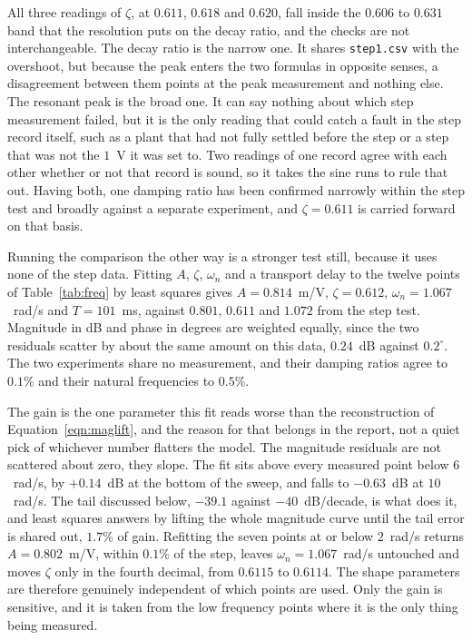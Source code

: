 All three readings of $\zeta$, at $0.611$, $0.618$ and $0.620$, fall inside the $0.606$ to
$0.631$ band that the resolution puts on the decay ratio, and the checks are not
interchangeable. The decay ratio is the narrow one. It shares \texttt{step1.csv} with the
overshoot, but because the peak enters the two formulas in opposite senses, a disagreement
between them points at the peak measurement and nothing else. The resonant peak is the broad
one. It can say nothing about which step measurement failed, but it is the only reading that
could catch a fault in the step record itself, such as a plant that had not fully settled
before the step or a step that was not the $1$~V it was set to. Two readings of one record
agree with each other whether or not that record is sound, so it takes the sine runs to rule
that out. Having both, one damping ratio has been confirmed narrowly within the step test
and broadly against a separate experiment, and $\zeta = 0.611$ is carried forward on that
basis.

Running the comparison the other way is a stronger test still, because it uses none of the
step data. Fitting $A$, $\zeta$, $\omega_n$ and a transport delay to the twelve points of
Table~\ref{tab:freq} by least squares gives $A = 0.814$~m/V, $\zeta = 0.612$,
$\omega_n = 1.067$~rad/s and $T = 101$~ms, against $0.801$, $0.611$ and $1.072$ from the step
test. Magnitude in dB and phase in degrees are weighted equally, since the two residuals
scatter by about the same amount on this data, $0.24$~dB against $0.2^\circ$. The two
experiments share no measurement, and their damping ratios agree to $0.1$\% and their natural
frequencies to $0.5$\%.

The gain is the one parameter this fit reads worse than the reconstruction of
Equation~\ref{eqn:maglift}, and the reason for that belongs in the report, not a quiet pick of
whichever number flatters the model. The magnitude residuals are not scattered about zero, they
slope. The fit sits above every measured point below $6$~rad/s, by $+0.14$~dB at the bottom of
the sweep, and falls to $-0.63$~dB at $10$~rad/s. The tail discussed below, $-39.1$ against
$-40$~dB/decade, is what does it, and least squares answers by lifting the whole magnitude
curve until the tail error is shared out, $1.7$\% of gain. Refitting the seven points at or
below $2$~rad/s returns $A = 0.802$~m/V, within $0.1$\% of the step, leaves
$\omega_n = 1.067$~rad/s untouched and moves $\zeta$ only in the fourth decimal, from
$0.6115$ to $0.6114$. The shape parameters are
therefore genuinely independent of which points are used. Only the gain is sensitive, and it is
taken from the low frequency points where it is the only thing being measured.

